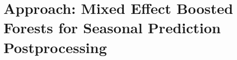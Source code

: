 \documentclass[ba-lentz.tex]{subfile}
\begin{document}
{\let\clearpage\relax \chapter{Approach: Mixed Effect Boosted Forests for Seasonal Prediction Postprocessing}}\label{approach}
\end{document}
